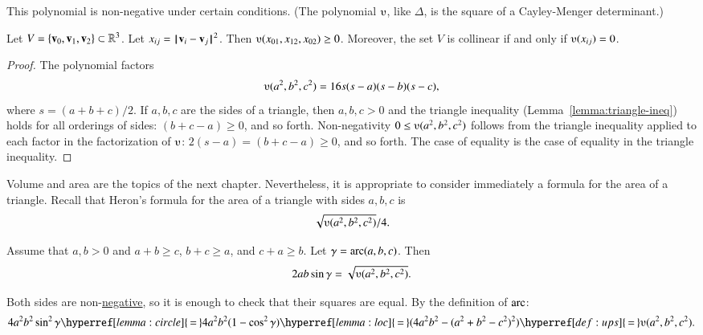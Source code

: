 This polynomial is non-negative under certain conditions. (The polynomial
$\ups$, like $\Delta$, 
is the square of a Cayley-Menger determinant.)  


\begin{lemma}[]\label{lemma:ups} Let
  $V=\{{\mathbf v}_0,{\mathbf v}_1,{\mathbf v}_2\}\subset\mathbb{R}^3$.  Let $x_{ij} =
  \norm{\v_i}{\v_j}^2$.  Then $\ups(x_{01},x_{12},x_{02})\ge 0$.
  Moreover, the set $V$ is collinear if and only if $\ups(x_{ij}) =
  0$.
\end{lemma}

\begin{proof}
The polynomial factors
\begin{displaymath}
\ups(a^2,b^2,c^2) = 16 s (s-a) (s-b)
  (s-c),
\end{displaymath}
where $s = (a+b+c)/2$.  If $a,b,c$ are the sides of a triangle, then
$a,b,c>0$ and the triangle inequality (Lemma~\ref{lemma:triangle-ineq})
holds for all orderings of sides: $(b+c-a)\ge 0$, and so forth.
Non-negativity $0\le \ups(a^2,b^2,c^2)$ follows from the triangle
inequality applied to each factor in the factorization of $\ups$:
$2(s-a) = (b+c-a) \ge0$, and so forth.  The case of equality is the
case of equality in the triangle inequality.
%
%
\end{proof}


%
Volume and area are the topics of the next chapter.  Nevertheless, it
is appropriate to consider immediately a formula for the area of a
triangle.  Recall that Heron's formula for the area of a triangle with
sides $a,b,c$
is \begin{displaymath}\sqrt{\ups(a^2,b^2,c^2)}/4.\end{displaymath}

\begin{lemma}\label{lemma:los}
Assume that $a,b>0$ and $a+b\ge c$, $b+c\ge a$, and $c+a\ge b$.
Let $\gamma=\operatorname{arc}(a,b,c)$.  Then
\begin{displaymath}2 a b \sin\gamma =
  \sqrt{\ups(a^2,b^2,c^2)}.\end{displaymath}
\end{lemma}
%
%
%
\begin{proved}
  Both sides are non-\hyperref[lemma:sin-pos]{negative}, so it is
  enough to check that their squares are equal.  By the definition of
  $\operatorname{arc}$:
\begin{displaymath}
4 a^2 b^2 \sin^2\gamma 
\hyperref[lemma:circle]{\,=\,} 4 a^2 b^2 (1-\cos^2\gamma) 
\hyperref[lemma:loc]{\,=\,} (4 a^2 b^2 - (a^2 + b^2 -
c^2)^2) 
\hyperref[def:ups]{\,=\,} \ups(a^2,b^2,c^2).\end{displaymath}
\swallowed\end{proved}

